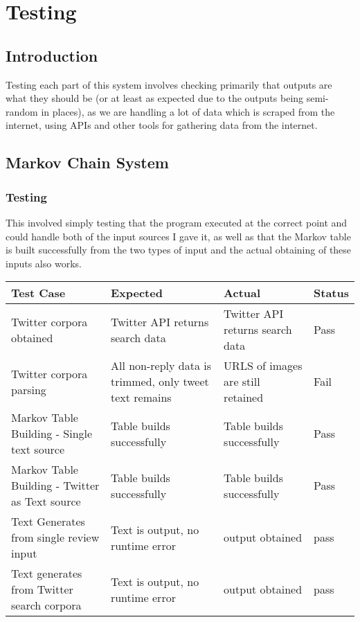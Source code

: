 \chapter{\label{ch:5-testing} Testing}


\section{Introduction}
Testing each part of this system involves checking primarily that outputs are what they should be (or at least as expected due to the outputs being semi-random in places), as we are handling a lot of data which is scraped from the internet, using APIs and other tools for gathering data from the internet. 


\section{Markov Chain System}
\subsection{Testing}
This involved simply testing that the program executed at the correct point and could handle both of the input sources I gave it, as well as that the Markov table is built successfully from the two types of input and the actual obtaining of these inputs also works.

\begin{center}
	\begin{tabular}{||m{15em} m{10em} m{10em} m{4em}||} 
		
		\hline
		Test Case & Expected & Actual & Status \\ [0.5ex] 
		\hline\hline
		Twitter corpora obtained& Twitter API returns search data& Twitter API returns search data& Pass\\
		\hline
		Twitter corpora parsing& All non-reply data is trimmed, only tweet text remains& URLS of images are still retained& Fail\\
		\hline
		Markov Table Building - Single text source& Table builds successfully& Table builds successfully& Pass\\
		\hline
		Markov Table Building - Twitter as Text source& Table builds successfully & Table builds successfully& Pass\\
		\hline
		Text Generates from single review input& Text is output, no runtime error& output obtained& pass\\
		\hline
		Text generates from Twitter search corpora& Text is output, no runtime error& output obtained& pass\\ [1ex] 
		\hline
	\end{tabular}
\end{center}

